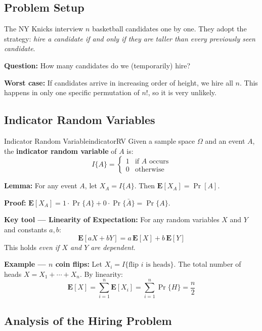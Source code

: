 \subsection{Problem Setup}

The NY Knicks interview $n$ basketball candidates one by one. They adopt the strategy:
\emph{hire a candidate if and only if they are taller than every previously seen candidate}.

\textbf{Question:} How many candidates do we (temporarily) hire?

\textbf{Worst case:} If candidates arrive in increasing order of height, we hire all $n$.
This happens in only one specific permutation of $n!$, so it is very unlikely.

\subsection{Indicator Random Variables}

\begin{definition}{Indicator Random Variable}{indicatorRV}
Given a sample space $\Omega$ and an event $A$, the \textbf{indicator random variable}
of $A$ is:
\[
  I\{A\} = \begin{cases} 1 & \text{if } A \text{ occurs} \\ 0 & \text{otherwise} \end{cases}
\]

\textbf{Lemma:} For any event $A$, let $X_A = I\{A\}$. Then $\mathbf{E}[X_A] = \Pr[A]$.

\textbf{Proof:} $\mathbf{E}[X_A] = 1 \cdot \Pr\{A\} + 0 \cdot \Pr\{\bar{A}\} = \Pr\{A\}$.
\end{definition}

\textbf{Key tool — Linearity of Expectation:} For any random variables $X$ and $Y$ and
constants $a, b$:
\[
  \mathbf{E}[aX + bY] = a\,\mathbf{E}[X] + b\,\mathbf{E}[Y]
\]
This holds \emph{even if $X$ and $Y$ are dependent}.

\textbf{Example — $n$ coin flips:} Let $X_i = I\{\text{flip } i \text{ is heads}\}$.
The total number of heads $X = X_1 + \cdots + X_n$. By linearity:
\[
  \mathbf{E}[X] = \sum_{i=1}^{n} \mathbf{E}[X_i] = \sum_{i=1}^{n} \Pr\{H\} = \frac{n}{2}
\]

\subsection{Analysis of the Hiring Problem}

